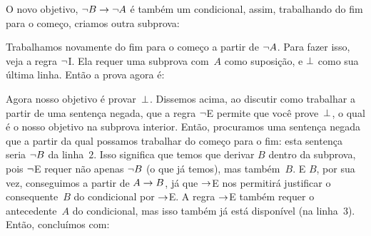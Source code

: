 \begin{fitchproof}
\open
{}
\ellipsesline
{}
\close
{}
\end{fitchproof}
O novo objetivo, $\neg B \rightarrow \neg A$ \'e  tamb\'em  um  condicional, assim, trabalhando do fim para o come\c co, criamos outra subprova:

\begin{fitchproof}
	\open
	\open
	\ellipsesline
	\close
	\close
\end{fitchproof}
Trabalhamos novamente do fim para o come\c co a partir de $\neg A$.  Para fazer isso, veja a regra $\neg$I. Ela requer uma subprova com~$A$ como suposi\c c\~ao, e $\bot$ como sua \'ultima linha. Ent\~ao a prova agora \'e:
 
\begin{fitchproof}
	\open
	\open
	\open{}
	\ellipsesline
	\close
	\close
	\close
\end{fitchproof}
Agora nosso objetivo \'e provar~$\bot$. Dissemos acima, ao discutir como trabalhar a partir de uma senten\c ca negada, que a regra $\neg$E permite que voc\^e prove~$\bot$, o qual \'e o nosso objetivo na subprova interior. Ent\~ao, procuramos uma senten\c ca negada  que a partir da qual possamos trabalhar do come\c co para o fim: esta senten\c ca seria $\neg B$ da linha~$2$. Isso significa que temos que derivar $B$ dentro da subprova, pois $\neg$E requer n\~ao apenas $\neg B$ (o que j\'a temos), mas tamb\'em~$B$. E $B$, por sua vez, conseguimos a partir de $A \rightarrow B$, j\'a que $\rightarrow$E nos permitir\'a justificar o consequente~$B$ do condicional por $\rightarrow$E. A regra $\rightarrow$E tamb\'em requer o antecedente~$A$ do condicional, mas isso tamb\'em j\'a est\'a dispon\'ivel (na linha~$3$). Ent\~ao, conclu\'imos  com:


\begin{fitchproof}
	\open
	\open
	\open{}
	\close
	\close
	\close
\end{fitchproof}

